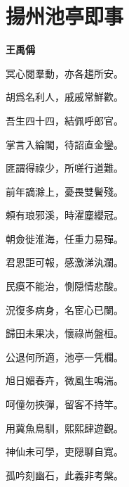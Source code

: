 \documentclass[12pt,a4paper]{ctexbook}
\begin{document}
\section{揚州池亭即事}
\textbf{王禹偁}\par\vspace{0.5em}
冥心閱羣動，亦各趨所安。\par
胡爲名利人，戚戚常鮮歡。\par
吾生四十四，結佩呼郎官。\par
掌言入綸閣，待詔直金鑾。\par
匪謂得祿少，所嗟行道難。\par
前年謫滁上，憂畏雙鬢殘。\par
頼有琅邪溪，時濯塵纓冠。\par
朝僉徙淮海，任重力易殫。\par
君恩詎可報，感激涕汍瀾。\par
民瘼不能治，惻隠情悲酸。\par
況復多病身，名宦心已闌。\par
歸田未果决，懷祿尚盤桓。\par
公退何所適，池亭一凭欄。\par
旭日媚春卉，微風生鳴湍。\par
呵僮勿挾彈，留客不持竿。\par
用冀魚鳥馴，熙熙肆遊觀。\par
神仙未可學，吏隠聊自寬。\par
孤吟刻幽石，此義非考槃。\par
\end{document}
